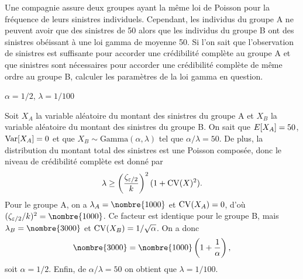 \begin{exercice}
  Une compagnie assure deux groupes ayant la même loi de Poisson pour
  la fréquence de leurs sinistres individuels. Cependant, les
  individus du groupe A ne peuvent avoir que des sinistres de 50 alors
  que les individus du groupe B ont des sinistres obéissant à une loi
  gamma de moyenne 50. Si l'on sait que l'observation de 
  sinistres est suffisante pour accorder une crédibilité complète au
  groupe A et que  sinistres sont nécessaires pour
  accorder une crédibilité complète de même ordre au groupe B,
  calculer les paramètres de la loi gamma en question.
  \begin{rep}
    $\alpha = 1/2$, $\lambda = 1/100$
  \end{rep}
  \begin{sol}
    Soit $X_A$ la variable aléatoire du montant des sinistres du
    groupe A et $X_B$ la variable aléatoire du montant des sinistres
    du groupe B. On sait que $E [ X_A ] = 50$, $\operatorname{Var} [ X_A ] = 0$ et que
    $X_B \sim \text{Gamma}(\alpha, \lambda)$ tel que $\alpha/\lambda =
    50$. De plus, la distribution du montant total des sinistres est
    une Poisson composée, donc le niveau de crédibilité complète est
    donné par
    \begin{displaymath}
      \lambda \ge
      \left(
        \frac{\zeta_{\varepsilon/2}}{k}
      \right)^2
      (1 + \operatorname{CV}(X)^2).
    \end{displaymath}
    Pour le groupe A, on a $\lambda_A = \nombre{1000}$ et
    $\operatorname{CV}(X_A) = 0$, d'où $(\zeta_{\varepsilon/2}/k)^2 =
    \nombre{1000}$. Ce facteur est identique pour le groupe B, mais
    $\lambda_B = \nombre{3000}$ et $\operatorname{CV}(X_B) = 1/\sqrt{\alpha}$. On
    a donc
    \begin{displaymath}
      \nombre{3000} = \nombre{1000}
      \left(
        1 + \frac{1}{\alpha}
      \right),
    \end{displaymath}
    soit $\alpha = 1/2$. Enfin, de $\alpha/\lambda = 50$ on obtient
    que $\lambda = 1/100$.
  \end{sol}
\end{exercice}

